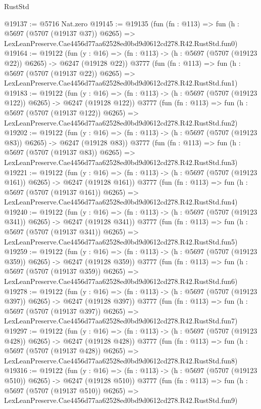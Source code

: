 \begin{lexlean}{RustStd}
\begin{coremodule}
@19137 := @5716 Nat.zero
@19145 := @19135
    (fun (fn : @113) =>
    fun (h : @5697 (@5707 (@19137 @37)) @6265) =>
    LexLeanPreserve.Cae4456d77aa62528ed0bd9d0612cd278.R42.RustStd.fun0)
@19164 := @19122
    (fun (y : @16) => (fn : @113) -> (h : @5697 (@5707 (@19123 @22)) @6265) -> @6247 (@19128 @22))
    @3777
    (fun (fn : @113) =>
    fun (h : @5697 (@5707 (@19137 @22)) @6265) =>
    LexLeanPreserve.Cae4456d77aa62528ed0bd9d0612cd278.R42.RustStd.fun1)
@19183 := @19122
    (fun (y : @16) => (fn : @113) -> (h : @5697 (@5707 (@19123 @122)) @6265) -> @6247 (@19128 @122))
    @3777
    (fun (fn : @113) =>
    fun (h : @5697 (@5707 (@19137 @122)) @6265) =>
    LexLeanPreserve.Cae4456d77aa62528ed0bd9d0612cd278.R42.RustStd.fun2)
@19202 := @19122
    (fun (y : @16) => (fn : @113) -> (h : @5697 (@5707 (@19123 @83)) @6265) -> @6247 (@19128 @83))
    @3777
    (fun (fn : @113) =>
    fun (h : @5697 (@5707 (@19137 @83)) @6265) =>
    LexLeanPreserve.Cae4456d77aa62528ed0bd9d0612cd278.R42.RustStd.fun3)
@19221 := @19122
    (fun (y : @16) => (fn : @113) -> (h : @5697 (@5707 (@19123 @161)) @6265) -> @6247 (@19128 @161))
    @3777
    (fun (fn : @113) =>
    fun (h : @5697 (@5707 (@19137 @161)) @6265) =>
    LexLeanPreserve.Cae4456d77aa62528ed0bd9d0612cd278.R42.RustStd.fun4)
@19240 := @19122
    (fun (y : @16) => (fn : @113) -> (h : @5697 (@5707 (@19123 @341)) @6265) -> @6247 (@19128 @341))
    @3777
    (fun (fn : @113) =>
    fun (h : @5697 (@5707 (@19137 @341)) @6265) =>
    LexLeanPreserve.Cae4456d77aa62528ed0bd9d0612cd278.R42.RustStd.fun5)
@19259 := @19122
    (fun (y : @16) => (fn : @113) -> (h : @5697 (@5707 (@19123 @359)) @6265) -> @6247 (@19128 @359))
    @3777
    (fun (fn : @113) =>
    fun (h : @5697 (@5707 (@19137 @359)) @6265) =>
    LexLeanPreserve.Cae4456d77aa62528ed0bd9d0612cd278.R42.RustStd.fun6)
@19278 := @19122
    (fun (y : @16) => (fn : @113) -> (h : @5697 (@5707 (@19123 @397)) @6265) -> @6247 (@19128 @397))
    @3777
    (fun (fn : @113) =>
    fun (h : @5697 (@5707 (@19137 @397)) @6265) =>
    LexLeanPreserve.Cae4456d77aa62528ed0bd9d0612cd278.R42.RustStd.fun7)
@19297 := @19122
    (fun (y : @16) => (fn : @113) -> (h : @5697 (@5707 (@19123 @428)) @6265) -> @6247 (@19128 @428))
    @3777
    (fun (fn : @113) =>
    fun (h : @5697 (@5707 (@19137 @428)) @6265) =>
    LexLeanPreserve.Cae4456d77aa62528ed0bd9d0612cd278.R42.RustStd.fun8)
@19316 := @19122
    (fun (y : @16) => (fn : @113) -> (h : @5697 (@5707 (@19123 @510)) @6265) -> @6247 (@19128 @510))
    @3777
    (fun (fn : @113) =>
    fun (h : @5697 (@5707 (@19137 @510)) @6265) =>
    LexLeanPreserve.Cae4456d77aa62528ed0bd9d0612cd278.R42.RustStd.fun9)

\end{coremodule}
\end{lexlean}
